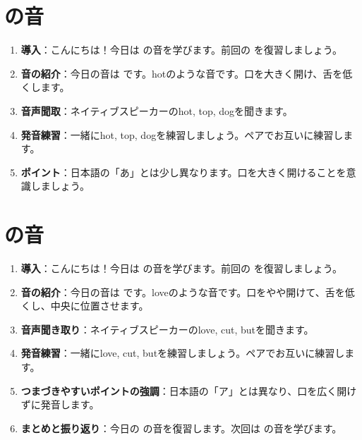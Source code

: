 \documentclass[book,jafontscale=0.9247]{jlreq}
\begin{document}
\section{\textipa{/\textscripta /} の音}
\begin{enumerate}
    \item \textbf{導入}：こんにちは！今日は \textipa{/\textscripta /} の音を学びます。前回の  を復習しましょう。
    \item \textbf{音の紹介}：今日の音は \textipa{/\textscripta /} です。hotのような音です。口を大きく開け、舌を低くします。
    \item \textbf{音声聞取}：ネイティブスピーカーのhot, top, dogを聞きます。
    \item \textbf{発音練習}：一緒にhot, top, dogを練習しましょう。ペアでお互いに練習します。
    \item \textbf{ポイント}：日本語の「あ」とは少し異なります。口を大きく開けることを意識しましょう。
\end{enumerate}

\section{\textipa{/\textturnv /} の音}
\begin{enumerate}
    \item \textbf{導入}：こんにちは！今日は \textipa{/\textturnv /} の音を学びます。前回の  を復習しましょう。
    \item \textbf{音の紹介}：今日の音は \textipa{/\textturnv /} です。loveのような音です。口をやや開けて、舌を低くし、中央に位置させます。
    \item \textbf{音声聞き取り}：ネイティブスピーカーのlove, cut, butを聞きます。
    \item \textbf{発音練習}：一緒にlove, cut, butを練習しましょう。ペアでお互いに練習します。
    \item \textbf{つまづきやすいポイントの強調}：日本語の「ア」とは異なり、口を広く開けずに発音します。
    \item \textbf{まとめと振り返り}：今日の \textipa{/\textturnv /} の音を復習します。次回は \textipa{/\textopeno :/} の音を学びます。
\end{enumerate}
\end{document}
